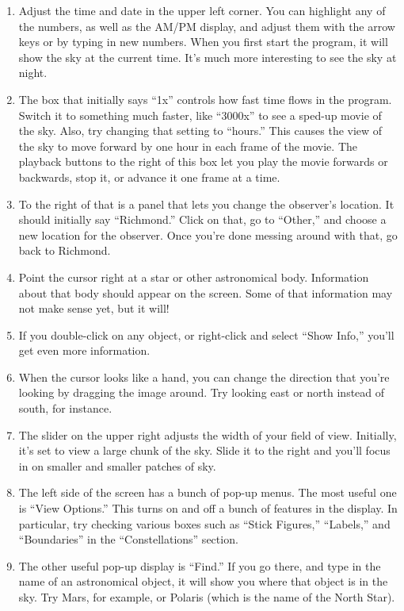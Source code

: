 \begin{enumerate}
\item Adjust the time and date in the upper left corner.  You can highlight
any of the numbers, as well as the AM/PM display, and adjust them with
the arrow keys or by typing in new numbers.  When you first start the 
program, it will show the sky at the current time.  It's much
more interesting to see the sky at night.
\item The box that initially says ``1x'' controls how fast time flows
in the program.  Switch it to something much faster, like ``3000x''
to see a sped-up movie of the sky.  Also, try changing that
setting to ``hours.''  This causes the view of the sky to
move forward by one hour in each frame of the movie.  The playback
buttons to the right of this box let you play the movie forwards or
backwards, stop it, or advance it one frame at a time.
\item To the right of that is a panel that lets you change the
observer's location.  It should initially say ``Richmond.''  Click on that,
go to ``Other,'' and choose a new location for the observer.
Once you're done messing around with that, go back to Richmond.
\item Point the cursor right at a star or other astronomical body.
Information about that body should appear on the screen.
Some of that information may not make sense yet, but it will!
\item If you double-click on any object, or right-click and select 
``Show Info,'' you'll get even more information.
\item When the cursor looks like a hand, you can change the direction
that you're looking by dragging the image around.  Try looking east
or north instead of south, for instance.
\item The slider on the upper right adjusts the width of your field
of view.  Initially, it's set to view a large chunk of the sky.
Slide it to the right and you'll focus in on smaller and smaller
patches of sky.
\item The left side of the screen has a bunch of pop-up menus.
The most useful one is ``View Options.''  This turns on and off
a bunch of features in the display.  In particular, try
checking various boxes such as ``Stick Figures,'' ``Labels,''
and ``Boundaries'' in the ``Constellations'' section.
\item The other useful pop-up display is ``Find.''  If you go there, and type
in the name of an astronomical object, it will show you where
that object is in the sky.  Try Mars, for example, or Polaris (which
is the name of the North Star).
\end{enumerate}

